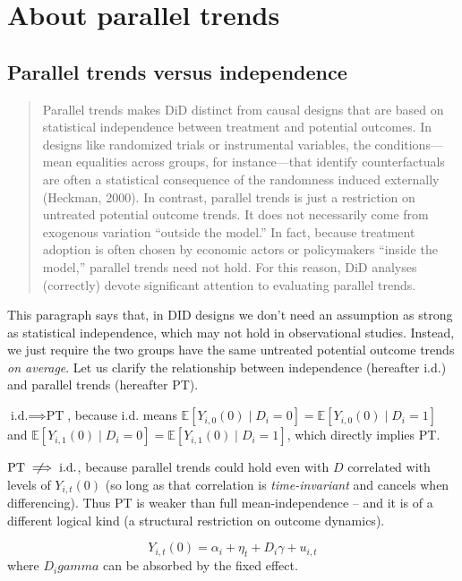 \documentclass[../didNotes.tex]{subfiles}
\begin{document}
\section{About parallel trends}

\subsection{Parallel trends versus independence}

\begin{quote}
  Parallel trends makes DiD distinct from causal designs that are based on statistical independence between treatment
  and potential outcomes. In designs like randomized trials or instrumental
  variables, the conditions—mean equalities across groups, for instance—that identify counterfactuals
  are often a statistical consequence of the randomness induced externally (Heckman, 2000).
  In contrast, parallel trends is just a restriction on untreated potential outcome trends. It does
  not necessarily come from exogenous variation “outside the model.” In fact, because treatment
  adoption is often chosen by economic actors or policymakers “inside the model,” parallel trends
  need not hold. For this reason, DiD analyses (correctly) devote significant attention to evaluating
  parallel trends.
\end{quote}

This paragraph says that, in DID designs we don't need an assumption as strong as statistical independence, which
may not hold in observational studies. Instead, we just require the two groups have the same untreated potential
outcome trends \textit{on average}. Let us clarify the relationship between independence (hereafter i.d.) and
parallel trends (hereafter PT).

$\text{i.d.} \implies \text{PT}$, because i.d.
means $\mathbb{E}[Y_{i,0}(0) \mid D_{i}=0] = \mathbb{E}[Y_{i,0}(0) \mid D_{i}=1]$
and $\mathbb{E}[Y_{i,1}(0) \mid D_{i}=0] = \mathbb{E}[Y_{i,1}(0) \mid D_{i}=1]$, which directly implies PT.

$\text{PT} \notimplies \text{i.d.}$, because parallel trends could hold even with $D$ correlated with levels of
$Y_{i,t}(0)$ (so long as that correlation is \textit{time-invariant} and cancels when differencing). Thus PT
is weaker than full mean-independence -- and it is of a different logical kind 
(a structural restriction on outcome dynamics).


$$
Y_{i,t}(0) = \alpha_{i} + \eta_{t} + D_{i} \gamma + u_{i,t}
$$
where $D_{i} gamma$ can be absorbed by the fixed effect.

\end{document}
